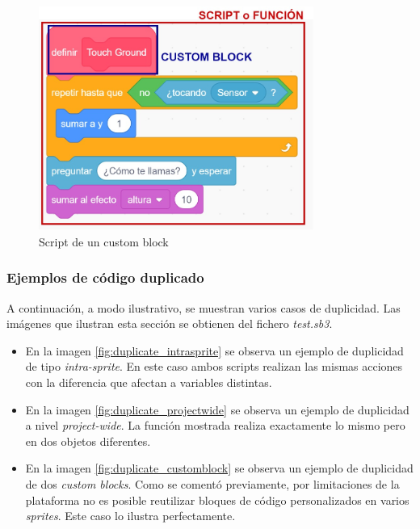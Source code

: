 \documentclass[a4paper, 12pt]{book}
\begin{document}
\begin{figure}[htb!]
	\centering
    \includegraphics[width=9cm, keepaspectratio]{img/script.jpg}
    \caption{Script de un custom block}
    \label{fig:script}
\end{figure}

\subsubsection{Ejemplos de código duplicado}

A continuación, a modo ilustrativo, se muestran varios casos de duplicidad. Las imágenes que ilustran esta sección se obtienen del fichero \textit{test.sb3}.

\begin{itemize}
\item En la imagen \ref{fig:duplicate_intrasprite} se observa un ejemplo de duplicidad de tipo \textit{intra-sprite}. En este caso ambos scripts realizan las mismas acciones con la diferencia que afectan a variables distintas.
\item En la imagen \ref{fig:duplicate_projectwide} se observa un ejemplo de duplicidad a nivel \textit{project-wide}. La función mostrada realiza exactamente lo mismo pero en dos objetos diferentes.
\item En la imagen \ref{fig:duplicate_customblock} se observa un ejemplo de duplicidad de dos \textit{custom blocks}. Como se comentó previamente, por limitaciones de la plataforma no es posible reutilizar bloques de código personalizados en varios \textit{sprites}. Este caso lo ilustra perfectamente.
\end{itemize}
\end{document}
